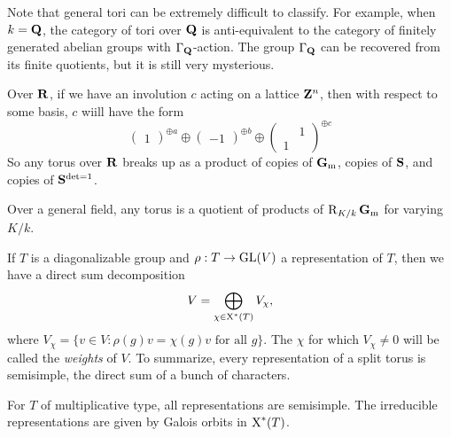 Note that general tori can be extremely difficult to classify. For example, 
when $k=\mathbf{Q}$, the category of tori over $\mathbf{Q}$ is anti-equivalent to the 
category of finitely generated abelian groups with $\Gamma_{\mathbf{Q}}$-action. The 
group $\Gamma_{\mathbf{Q}}$ can be recovered from its finite quotients, but it is 
still very mysterious. 

\begin{example}
Over $\mathbf{R}$, if we have an involution $c$ acting on a lattice $\mathbf{Z}^n$, then 
with respect to some basis, $c$ wiill have the form 
\[
  \begin{pmatrix} 1 \end{pmatrix}^{\oplus a} \oplus\begin{pmatrix} -1 \end{pmatrix}^{\oplus b} \oplus\begin{pmatrix} & 1 \\ 1 \end{pmatrix}^{\oplus c}
\]
So any torus over $\mathbf{R}$ breaks up as a product of copies of $\mathbf{G}_\mathrm{m}$, copies of 
$\mathbf{S}$, and copies of $\mathbf{S}^{\det=1}$. 
\end{example}

Over a general field, any torus is a quotient of products of 
$\operatorname{R}_{K/k}\mathbf{G}_\mathrm{m}$ for varying $K/k$. 

If $T$ is a diagonalizable group and $\rho:T\to \operatorname{GL}(V)$ a representation of 
$T$, then we have a direct sum decomposition 
\[
  V=\bigoplus_{\chi\in \operatorname{X}^\ast(T)} V_\chi ,
\]
where $V_\chi=\{v\in V:\rho(g)v = \chi(g) v\text{ for all }g\}$. The 
$\chi$ for which $V_\chi\ne 0$ will be called the \emph{weights} of $V$. To 
summarize, every representation of a split torus is semisimple, the direct 
sum of a bunch of characters. 

For $T$ of multiplicative type, all representations are semisimple. The 
irreducible representations are given by Galois orbits in 
$\operatorname{X}^\ast(T)$. 





